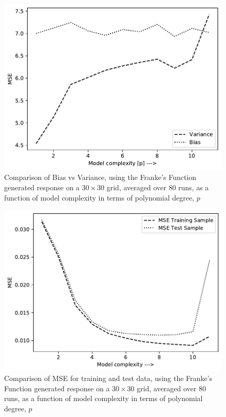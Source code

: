 \documentclass[%
oneside,                 %
final,                   %
10pt]{article}
\begin{document}
\begin{figure}[!h]
        \centering 
         \includegraphics[scale=0.7]{../Results/bias_var.pdf} 
        \caption{Comparison of Bias vs Variance, using the Franke's Function generated response on a $30\times 30$ grid, averaged over 80 runs, as a function of model complexity in terms of polynomial degree, $p$}
        \label{fig:betas_al123l}   
\end{figure}  

\begin{figure}[!h]
        \centering 
         \includegraphics[scale=0.7]{../Results/bias_var_MSE.pdf} 
        \caption{Comparison of MSE for training and test data, using the Franke's Function generated response on a $30\times 30$ grid, averaged over 80 runs, as a function of model complexity in terms of polynomial degree, $p$}
        \label{fig:betas_al123l}   
\end{figure}  
\end{document}
